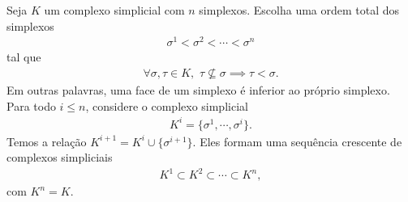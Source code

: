 \documentclass[12pt, a4paper]{article}
\theoremstyle{plain}
\theoremstyle{definition}
\theoremstyle{remark}
\newcommand{\ident}{\hspace{2em}}
\begin{document}
\ident Seja $K$ um complexo simplicial com $n$ simplexos. Escolha uma ordem total dos simplexos
\begin{align*}
    \sigma^1 < \sigma^2 < \cdots < \sigma^n
\end{align*}
tal que 
\begin{align*}
    \forall \sigma, \tau \in K, \,\, \tau \nsubseteq \sigma \implies \tau < \sigma.
\end{align*}
Em outras palavras, uma face de um simplexo é inferior ao próprio simplexo. Para todo $i \leq n$,
considere o complexo simplicial
\begin{align*}
    K^i = \{\sigma^1, \cdots, \sigma^i \}.
\end{align*}
Temos a relação $K^{i+1} = K^i \cup \{\sigma^{i+1}\}$. Eles formam uma sequência crescente de
complexos simpliciais
\begin{align*}
    K^1 \subset K^2 \subset \cdots \subset K^n,
\end{align*}
com $K^n = K$.
\end{document}
